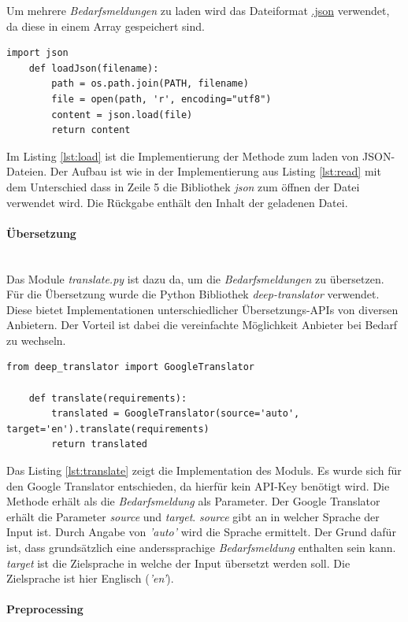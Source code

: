Um mehrere \emph{Bedarfsmeldungen} zu laden wird das Dateiformat \url{.json} verwendet, da diese in einem Array gespeichert sind.
\begin{lstlisting}[caption={Implementation der Methode loadJson() des Moduls \emph{readRequirements.py}}, label=lst:load]
	import json
	def loadJson(filename):
		path = os.path.join(PATH, filename)
		file = open(path, 'r', encoding="utf8")
		content = json.load(file)
		return content
\end{lstlisting}
Im Listing \ref{lst:load} ist die Implementierung der Methode zum laden von JSON-Dateien. Der Aufbau ist wie in der Implementierung aus Listing \ref{lst:read} mit dem Unterschied dass in Zeile 5 die Bibliothek \emph{json} zum öffnen der Datei verwendet wird. Die Rückgabe enthält den Inhalt der geladenen Datei.
\paragraph{Übersetzung}\mbox{}\\
Das Module \emph{translate.py} ist dazu da, um die \emph{Bedarfsmeldungen} zu übersetzen. Für die Übersetzung wurde die Python Bibliothek \emph{deep-translator} verwendet. Diese bietet Implementationen unterschiedlicher Übersetzungs-APIs von diversen Anbietern. Der Vorteil ist dabei die vereinfachte Möglichkeit Anbieter bei Bedarf zu wechseln.
\begin{lstlisting}[caption={Implementation des Moduls \emph{translate.py}}, label=lst:translate]
	from deep_translator import GoogleTranslator
	
	def translate(requirements):
		translated = GoogleTranslator(source='auto', target='en').translate(requirements)
		return translated
\end{lstlisting}
Das Listing \ref{lst:translate} zeigt die Implementation des Moduls. Es wurde sich für den Google Translator entschieden, da hierfür kein API-Key benötigt wird. Die Methode erhält als die \emph{Bedarfsmeldung} als Parameter. Der Google Translator erhält die Parameter \emph{source} und \emph{target}. \emph{source} gibt an in welcher Sprache der Input ist. Durch Angabe von \emph{'auto'} wird die Sprache ermittelt. Der Grund dafür ist, dass grundsätzlich eine anderssprachige \emph{Bedarfsmeldung} enthalten sein kann. \emph{target} ist die Zielsprache in welche der Input übersetzt werden soll. Die Zielsprache ist hier Englisch (\emph{'en'}).
\paragraph{Preprocessing}\mbox{}\\

